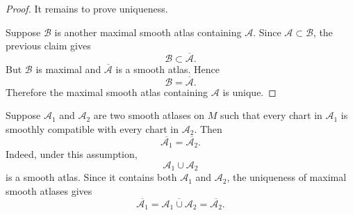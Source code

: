 \begin{proof}
It remains to prove uniqueness.

Suppose $\mathcal B$ is another maximal smooth atlas containing $\mathcal A$.
Since $\mathcal A\subset \mathcal B$, the previous claim gives
\[
  \mathcal B\subset \overline{\mathcal A}.
\]
But $\mathcal B$ is maximal and $\overline{\mathcal A}$ is a smooth atlas. Hence
\[
  \mathcal B=\overline{\mathcal A}.
\]
Therefore the maximal smooth atlas containing $\mathcal A$ is unique.
\end{proof}

\begin{remark}
Suppose $\mathcal A_1$ and $\mathcal A_2$ are two smooth atlases on $M$ such that every chart in $\mathcal A_1$ is smoothly compatible with every chart in $\mathcal A_2$.
Then
\[
  \overline{\mathcal A_1}
  =
  \overline{\mathcal A_2}.
\]
Indeed, under this assumption,
\[
  \mathcal A_1\cup \mathcal A_2
\]
is a smooth atlas. Since it contains both $\mathcal A_1$ and $\mathcal A_2$, the uniqueness of maximal smooth atlases gives
\[
  \overline{\mathcal A_1}
  =
  \overline{\mathcal A_1\cup \mathcal A_2}
  =
  \overline{\mathcal A_2}.
\]
\end{remark}

